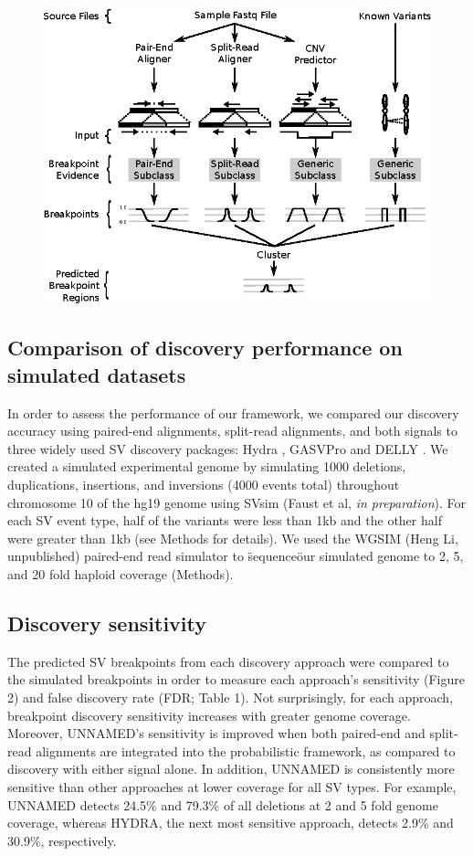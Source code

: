\documentclass[11pt]{article}
\begin{document}
\begin{figure}
\includegraphics{Workflow.eps}
\end{figure}

\subsection{Comparison of discovery performance on simulated datasets}
In order to assess the performance of our framework, we compared our discovery
accuracy using paired-end alignments, split-read alignments, and both signals to 
three widely used SV discovery packages: Hydra \cite{quinlan2010b},
GASVPro \cite{sindi2012} and DELLY \cite{rausch2012b}. We created a simulated 
experimental genome by simulating 1000 deletions, duplications, insertions, 
and inversions (4000 events total) throughout chromosome 10 of the hg19 genome 
using SVsim (Faust et al, \emph{in preparation}).  For each SV event type, half
of the variants were less than 1kb and the other half were greater than 1kb (see
Methods for details).  We used the WGSIM (Heng Li, unpublished) paired-end read 
simulator to \"sequence\" our simulated genome to 2, 5, and 20 fold 
haploid coverage (Methods).

\subsection{Discovery sensitivity}
The predicted SV breakpoints from each discovery approach were compared to the
simulated breakpoints in order to measure each approach's sensitivity (Figure 2) 
and false discovery rate (FDR; Table 1). Not surprisingly, for each approach,
breakpoint discovery sensitivity increases with greater genome coverage.
Moreover, UNNAMED's sensitivity is improved when both paired-end and split-read
alignments are integrated into the probabilistic framework, as compared to 
discovery with either signal alone. In addition, UNNAMED is consistently more
sensitive than other approaches at lower coverage for all SV types. For example,
UNNAMED detects 24.5\% and 79.3\% of all deletions at 2 and 5 fold genome
coverage, whereas HYDRA, the next most sensitive approach, detects 2.9\% and
30.9\%, respectively. 
\end{document}
